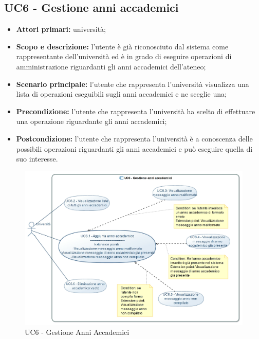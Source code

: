\documentclass[AnalisiDeiRequisiti.tex]{subfiles}
\begin{document}
\subsection{UC6 - Gestione anni accademici}
\begin{itemize}
	\item \textbf{Attori primari:} università;
	\item \textbf{Scopo e descrizione:} l'utente è già riconosciuto dal sistema come rappresentante dell'università ed è in grado di eseguire operazioni di amministrazione riguardanti gli anni accademici dell'ateneo;
	\item \textbf{Scenario principale:} l'utente che rappresenta l'università visualizza una lista di operazioni eseguibili sugli anni accademici e ne sceglie una;
	\item \textbf{Precondizione:} l'utente che rappresenta l'università ha scelto di effettuare una operazione riguardante gli anni accademici; 
	\item \textbf{Postcondizione:} l'utente che rappresenta l'università è a conoscenza delle possibili operazioni riguardanti gli anni accademici e può eseguire quella di suo interesse.
\end{itemize}

\begin{figure}[H]
	\centering
	\includegraphics[width=1.1\linewidth]{UC6.jpg}
	\caption{UC6 - Gestione Anni Accademici}
	\label{fig:UC6 - Gestione Anni Accademici}
\end{figure}
\end{document}
